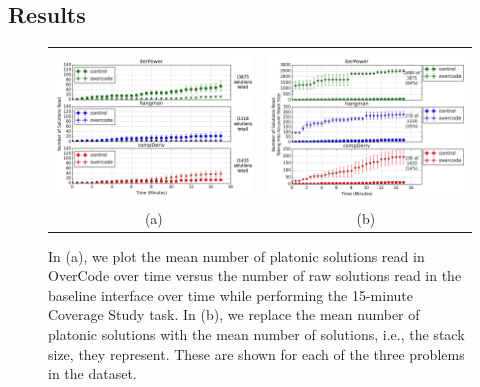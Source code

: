 \subsection{Results} \label{coverageResults}
\begin{figure}[b!]
\begin{tabular}{c | c}
\begin{minipage}{.5\linewidth}
\centering
\includegraphics[width=\linewidth]{Body/figures/overcode/prettyReadCoverage.png}
\end{minipage}
&
\begin{minipage}{.5\linewidth}
\centering
\includegraphics[width=\linewidth]{Body/figures/overcode/prettyPercentCoverage.png}
\end{minipage}
\\
(a) & (b)
\end{tabular}
\caption{In (a), we plot the mean number of platonic solutions read in OverCode over time versus the number of raw solutions read in the baseline interface over time while performing the 15-minute Coverage Study task. In (b), we replace the mean number of platonic solutions with the mean number of solutions, i.e., the stack size, they represent. These are shown for each of the three problems in the dataset.}
\label{readCoverage}
\end{figure}
